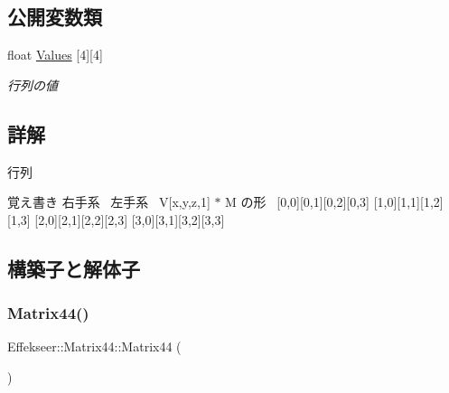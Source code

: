 \subsection*{公開変数類}
\begin{DoxyCompactItemize}
\item 
float \mbox{\hyperlink{struct_effekseer_1_1_matrix44_ac747413302e165521317a399db929313}{Values}} \mbox{[}4\mbox{]}\mbox{[}4\mbox{]}
\begin{DoxyCompactList}\small\item\em 行列の値 \end{DoxyCompactList}\end{DoxyCompactItemize}


\subsection{詳解}
行列 

\begin{DoxyNote}{覚え書き}
右手系~\newline
 左手系~\newline
 V\mbox{[}x,y,z,1\mbox{]} $\ast$ M の形~\newline
 \mbox{[}0,0\mbox{]}\mbox{[}0,1\mbox{]}\mbox{[}0,2\mbox{]}\mbox{[}0,3\mbox{]} \mbox{[}1,0\mbox{]}\mbox{[}1,1\mbox{]}\mbox{[}1,2\mbox{]}\mbox{[}1,3\mbox{]} \mbox{[}2,0\mbox{]}\mbox{[}2,1\mbox{]}\mbox{[}2,2\mbox{]}\mbox{[}2,3\mbox{]} \mbox{[}3,0\mbox{]}\mbox{[}3,1\mbox{]}\mbox{[}3,2\mbox{]}\mbox{[}3,3\mbox{]} 
\end{DoxyNote}


\subsection{構築子と解体子}
\mbox{\label{struct_effekseer_1_1_matrix44_a8dd9366a02a58a0652eaace2fd9bbb94}} 
\subsubsection{\texorpdfstring{Matrix44()}{Matrix44()}}
{\footnotesize\ttfamily Effekseer\+::\+Matrix44\+::\+Matrix44 (\begin{DoxyParamCaption}{ }\end{DoxyParamCaption})}



